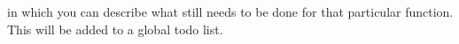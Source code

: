 
\begin{DoxyRefList}
\item[\label{todo__todo000001}%
\hypertarget{todo__todo000001}{}%
page \hyperlink{index}{Sprouts Documentation} ]in which you can describe what still needs to be done for that particular function. This will be added to a global todo list.
\end{DoxyRefList}